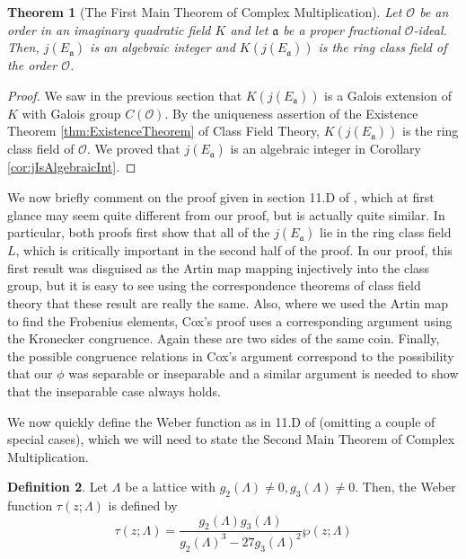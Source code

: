 \documentclass{amsart}
\newtheorem{thm}{Theorem}[section]
\theoremstyle{definition}
\newtheorem{definition}[thm]{Definition}
\theoremstyle{remark}
\numberwithin{equation}{section}
\newcommand{\cO}{\mathcal O}
\newcommand{\fka}{\mathfrak a}
\begin{document}
\begin{thm} [The First Main Theorem of Complex Multiplication] \label{thm:FirstMainTheoremOfComplexMultV2}
Let $\cO$ be an order in an imaginary quadratic field $K$ and let $\fka$ be a proper fractional $\cO$-ideal. Then, $j(E_{\fka})$ is an algebraic integer and $K(j(E_{\fka}))$ is the ring class field of the order $\cO$.
\end{thm}

\begin{proof}
We saw in the previous section that $K(j(E_{\fka}))$ is a Galois extension of $K$ with Galois group $C(\cO)$. By the uniqueness assertion of the Existence Theorem \ref{thm:ExistenceTheorem} of Class Field Theory, $K(j(E_{\fka}))$ is the ring class field of $\cO$. We proved that $j(E_{\fka})$ is an algebraic integer in Corollary \ref{cor:jIsAlgebraicInt}.
\end{proof}

 We now briefly comment on the proof given in section 11.D of \cite{CoxPrimes}, which at first glance may seem quite different from our proof, but is actually quite similar. In particular, both proofs first show that all of the $j(E_{\fka})$ lie in the ring class field $L$, which is critically important in the second half of the proof. In our proof, this first result was disguised as the Artin map mapping injectively into the class group, but it is easy to see using the correspondence theorems of class field theory that these result are really the same. Also, where we used the Artin map to find the Frobenius elements, Cox's proof uses a corresponding argument using the Kronecker congruence. Again these are two sides of the same coin. Finally, the possible congruence relations in Cox's argument correspond to the possibility that our $\phi$ was separable or inseparable and a similar argument is needed to show that the inseparable case always holds.
 
 We now quickly define the Weber function as in 11.D of \cite{CoxPrimes} (omitting a couple of special cases), which we will need to state the Second Main Theorem of Complex Multiplication.
 
 \begin{definition} \label{def:WeberFunction}
 Let $\Lambda$ be a lattice with $g_{2}(\Lambda) \neq 0, g_{3}(\Lambda) \neq 0$. Then, the Weber function $\tau(z; \Lambda)$ is defined by
 \[
 \tau(z; \Lambda) = \frac{g_{2}(\Lambda) g_{3}(\Lambda)}{g_{2}(\Lambda)^3 - 27 g_{3}(\Lambda)^2} \wp(z; \Lambda)
 \]
 \end{definition}
 
\end{document}
